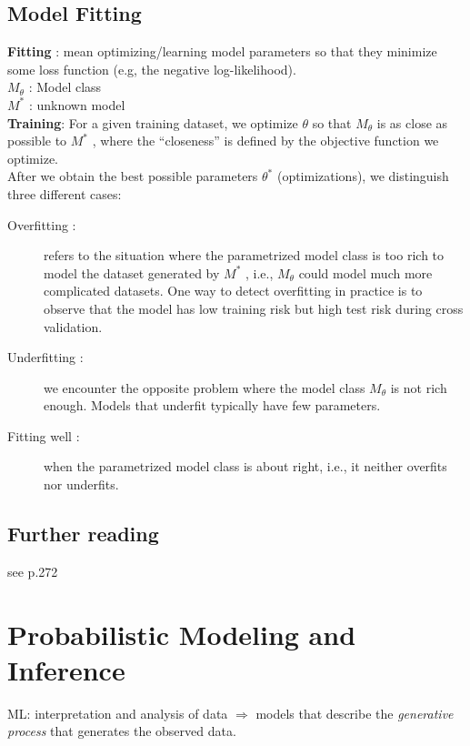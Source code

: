\subsection{Model Fitting}
\textbf{Fitting} : mean optimizing/learning model parameters so that they minimize some loss function (e.g, the negative log-likelihood). \\
\textbf{$M_{\theta}$} : Model class \\
\textbf{$M^{\text{*}}$} : unknown model \\
\textbf{Training}: For a given training dataset, we optimize $\theta$ so that $M_{\theta}$ is as close as possible to $M^{\text{*}}$ , where the “closeness” is defined by the objective function we optimize. \\
After we obtain the best possible parameters $\theta^{\text{*}}$ (optimizations), we distinguish three different cases:
\begin{description}
	\item[Overfitting : ] refers to the situation where the parametrized model class is too rich to model the dataset generated by $M^{\text{*}}$ , i.e., $M_{\theta}$ could model much more complicated datasets. One way to detect overfitting in practice is to
	observe that the model has low training risk but high test risk during cross validation.
	\item[Underfitting : ] we encounter the opposite problem where the model class $M_{\theta}$ is not rich enough. Models that underfit typically have few parameters.
	\item[Fitting well : ] when the parametrized model class is about right, i.e., it neither overfits nor underfits.
\end{description}

\subsection{Further reading}
see p.272

\section{Probabilistic Modeling and Inference}
ML: interpretation and analysis of data $\Rightarrow$ models that describe the \textit{generative process} that generates the observed data.

